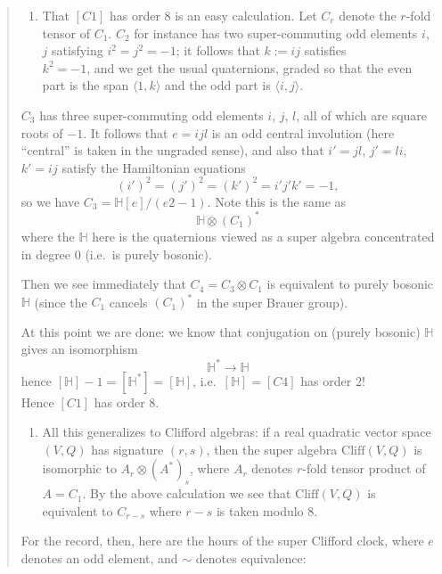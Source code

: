 \documentclass{article}
\def\tightlist{}
\begin{document}
\begin{quote}
\begin{enumerate}
\def\labelenumi{\arabic{enumi}.}
\setcounter{enumi}{2}
\tightlist
\item
  That \([C1]\) has order 8 is an easy calculation. Let \(C_r\) denote
  the \(r\)-fold tensor of \(C_1\). \(C_2\) for instance has two
  super-commuting odd elements \(i\), \(j\) satisfying
  \(i^2 = j^2 = -1\); it follows that \(k := ij\) satisfies\\
  \(k^2 = -1\), and we get the usual quaternions, graded so that the
  even part is the span \(\langle 1, k\rangle\) and the odd part is
  \(\langle i, j\rangle\).
\end{enumerate}

\(C_3\) has three super-commuting odd elements \(i\), \(j\), \(l\), all
of which are square roots of \(-1\). It follows that \(e = ijl\) is an
odd central involution (here ``central'' is taken in the ungraded
sense), and also that \(i' = jl\), \(j' = li\), \(k' = ij\) satisfy the
Hamiltonian equations \[(i')^2 = (j')^2 = (k')^2 = i'j'k' = -1,\] so we
have \(C_3 = \mathbb{H}[e]/(e2 - 1)\). Note this is the same as
\[\mathbb{H} \otimes (C_1)^*\] where the \(\mathbb{H}\) here is the
quaternions viewed as a super algebra concentrated in degree 0 (i.e.~is
purely bosonic).

Then we see immediately that \(C_4 = C_3 \otimes C_1\) is equivalent to
purely bosonic \(\mathbb{H}\) (since the \(C_1\) cancels \((C_1)^*\) in
the super Brauer group).

At this point we are done: we know that conjugation on (purely bosonic)
\(\mathbb{H}\) gives an isomorphism \[\mathbb{H}^* \to \mathbb{H}\]
hence \([\mathbb{H}]-1 = [\mathbb{H}^*] = [\mathbb{H}]\),
i.e.~\([\mathbb{H}] = [C4]\) has order 2!\\
Hence \([C1]\) has order 8.

\begin{enumerate}
\def\labelenumi{\arabic{enumi}.}
\setcounter{enumi}{3}
\tightlist
\item
  All this generalizes to Clifford algebras: if a real quadratic vector
  space \((V, Q)\) has signature \((r, s)\), then the super algebra
  \(\mathrm{Cliff}(V, Q)\) is isomorphic to \(A_r \otimes (A^*)_s\),
  where \(A_r\) denotes \(r\)-fold tensor product of \(A = C_1\). By the
  above calculation we see that \(\mathrm{Cliff}(V, Q)\) is equivalent
  to \(C_{r-s}\) where \(r-s\) is taken modulo 8.
\end{enumerate}

For the record, then, here are the hours of the super Clifford clock,
where \(e\) denotes an odd element, and \(\sim\) denotes equivalence:


\end{quote}
\end{document}
